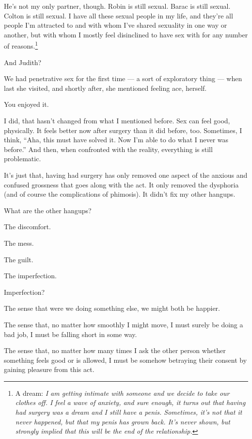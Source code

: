 \begin{paracol}{2}
\begin{leftcolumn}
He's not my only partner, though. Robin is still sexual. Barac is still sexual. Colton is still sexual. I have all these sexual people in my life, and they're all people I'm attracted to and with whom I've shared sexuality in one way or another, but with whom I mostly feel disinclined to have sex with for any number of reasons.\footnote{A dream: \emph{I am getting intimate with someone and we decide to take our clothes off. I feel a wave of anxiety, and sure enough, it turns out that having had surgery was a dream and I still have a penis. Sometimes, it's not that it never happened, but that my penis has grown back. It's never shown, but strongly implied that this will be the end of the relationship.}}

\begin{ally}
And Judith?
\end{ally}
We had penetrative sex for the first time --- a sort of exploratory thing --- when last she visited, and shortly after, she mentioned feeling ace, herself.

\begin{ally}
You enjoyed it.
\end{ally}
I did, that hasn't changed from what I mentioned before. Sex can feel good, physically. It feels better now after surgery than it did before, too. Sometimes, I think, ``Aha, this must have solved it. Now I'm able to do what I never was before.'' And then, when confronted with the reality, everything is still problematic.

It's just that, having had surgery has only removed one aspect of the anxious and confused grossness that goes along with the act. It only removed the dysphoria (and of course the complications of phimosis). It didn't fix my other hangups.

\begin{ally}
What are the other hangups?
\end{ally}
The discomfort.

The mess.

The guilt.

The imperfection.

\begin{ally}
Imperfection?
\end{ally}
The sense that were we doing something else, we might both be happier.

The sense that, no matter how smoothly I might move, I must surely be doing a bad job, I must be falling short in some way.

The sense that, no matter how many times I ask the other person whether something feels good or is allowed, I must be somehow betraying their consent by gaining pleasure from this act.
\newpage


\end{leftcolumn}
\end{paracol}
